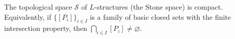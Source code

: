 The topological space $\mathcal{S}$ of $L$-structures (the Stone space) is compact. Equivalently, if $\{[P_i]\}_{i \in I}$ is a family of basic closed sets with the finite intersection property, then $\bigcap_{i \in I} [P_i] \neq \varnothing$.
